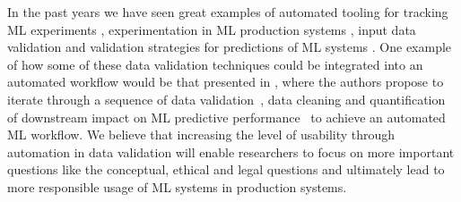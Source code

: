 In the past years we have seen great examples of automated tooling for tracking ML experiments \cite{Schelter2017}, experimentation in ML production systems \cite{Bose2017a}, input data validation \cite{Schelter2018,Breck2019} and validation strategies for predictions of ML systems \cite{Rabanser2018,Schelter2020,DAmour2020}. One example of how some of these data validation techniques could be integrated into an automated workflow would be that presented in \cite{Rukat2020}, where the authors propose to iterate through a sequence of data validation~\cite{Schelter2018}, data cleaning\cite{Biessmann2018a} and quantification of downstream impact on ML predictive performance~\cite{Schelter2020} to achieve an automated ML workflow. We believe that increasing the level of usability through automation in data validation will enable researchers to focus on more important questions like the conceptual, ethical and legal questions and ultimately lead to more responsible usage of ML systems in production systems.